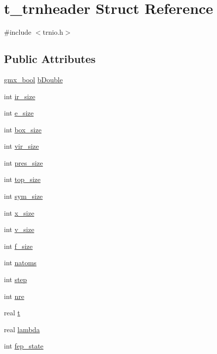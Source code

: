 \hypertarget{structt__trnheader}{\section{t\-\_\-trnheader \-Struct \-Reference}
\label{structt__trnheader}
}


{\ttfamily \#include $<$trnio.\-h$>$}

\subsection*{\-Public \-Attributes}
\begin{DoxyCompactItemize}
\item 
\hyperlink{include_2types_2simple_8h_a8fddad319f226e856400d190198d5151}{gmx\-\_\-bool} \hyperlink{structt__trnheader_a1702f44f769ec3e12c74749b9127b8eb}{b\-Double}
\item 
int \hyperlink{structt__trnheader_ad2f791b7c49a60bd8f175583792973bf}{ir\-\_\-size}
\item 
int \hyperlink{structt__trnheader_a1f2e8d1ef5124dd1fc9aa7c5ceb23304}{e\-\_\-size}
\item 
int \hyperlink{structt__trnheader_a6d1abbf1dc8b73f11a29bd4ceeb265c1}{box\-\_\-size}
\item 
int \hyperlink{structt__trnheader_a784c4f2af9b4b38ad62e22eedaf6074f}{vir\-\_\-size}
\item 
int \hyperlink{structt__trnheader_a2db3e9e6e7332660ef26137fbf235cb3}{pres\-\_\-size}
\item 
int \hyperlink{structt__trnheader_a991fab92fa4f91584426544a33562899}{top\-\_\-size}
\item 
int \hyperlink{structt__trnheader_a9cebe2610b197f714325c695f075a9bf}{sym\-\_\-size}
\item 
int \hyperlink{structt__trnheader_ae2ebfead30e41db0c308c9ffd19e5aca}{x\-\_\-size}
\item 
int \hyperlink{structt__trnheader_a9f82d15708b9c392dea5aa0ed59419cc}{v\-\_\-size}
\item 
int \hyperlink{structt__trnheader_a7d462f68a0cc0c9dc071d834acf91f77}{f\-\_\-size}
\item 
int \hyperlink{structt__trnheader_a2d9616746b1cab60402cd60e3f391a6d}{natoms}
\item 
int \hyperlink{structt__trnheader_a2376a294f160761e8e4213ced7c25368}{step}
\item 
int \hyperlink{structt__trnheader_a5cd3075da2cf53e81da9916d07f3e029}{nre}
\item 
real \hyperlink{structt__trnheader_a5562cb096541c03b7b3255a51bcec323}{t}
\item 
real \hyperlink{structt__trnheader_abd8b05da272ec1f7efe6af1bce13224c}{lambda}
\item 
int \hyperlink{structt__trnheader_a74b199929cbdd302efd05ff9ecf71dd6}{fep\-\_\-state}
\end{DoxyCompactItemize}


